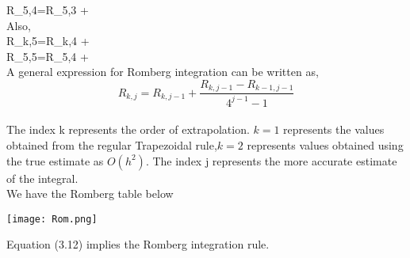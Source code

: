 \documentclass[a4paper,12pt]{report}
\numberwithin{equation}{section}
\begin{document}
\Rightarrow R_{5,4}=R_{5,3} + \\

Also,\\

R_{k,5}=R_{k,4} + \\

\Rightarrow R_{5,5}=R_{5,4} + \\

A general expression for Romberg integration can be written as,\\
\begin{equation}
R_{k,j}=R_{k,j-1} + \frac{R_{k,j-1}-R_{k-1,j-1}}{4^{j-1}-1}
\end{equation}
\\
The index k represents the order of extrapolation. $k=1$ represents the values obtained from the regular Trapezoidal rule,$k=2$ represents values obtained using the true estimate as $O(h^2)$. The index j represents the more accurate estimate of the integral.\\
We have the Romberg table below\\
\begin{center}
\texttt{[image: Rom.png]}
\end{center}





Equation (3.12) implies the Romberg integration rule.
\end{document}
